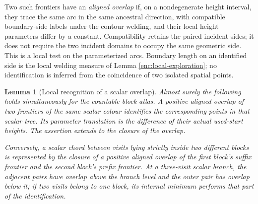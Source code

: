 \documentclass[11pt]{article}
\numberwithin{equation}{section}
\newtheorem{lemma}[theorem]{Lemma}
\theoremstyle{definition}
\theoremstyle{remark}
\newcommand{\1}{\mathbf 1}
\begin{document}
Two such frontiers have an \emph{aligned overlap} if, on a nondegenerate
height interval, they trace the same arc in the same ancestral
direction, with compatible boundary-side labels under the contour
welding, and their local height parameters differ by a constant.
Compatibility retains the paired incident sides; it does not require
the two incident domains to occupy the same geometric side.
This is a local test on the parameterized arcs.  Boundary length on
an identified side is the local welding measure of Lemma
\ref{enc:local-exploration}; no identification is inferred from the
coincidence of two isolated spatial points.

\begin{lemma}[Local recognition of a scalar overlap]
\label{ker:frontier-overlap}
Almost surely the following holds simultaneously for the countable
block atlas.  A positive aligned overlap of two frontiers of the same
scalar colour identifies the corresponding points in that scalar
tree.  Its parameter translation is the difference of their actual
used-start heights.  The assertion extends to the closure of the
overlap.

Conversely, a scalar chord between visits lying strictly inside two
different blocks is represented by the closure of a positive aligned
overlap of the first block's suffix frontier and the second block's
prefix frontier.  At a three-visit scalar branch, the adjacent pairs
have overlap above the branch level and the outer pair has overlap
below it; if two visits belong to one block, its internal minimum
performs that part of the identification.
\end{lemma}
\end{document}
